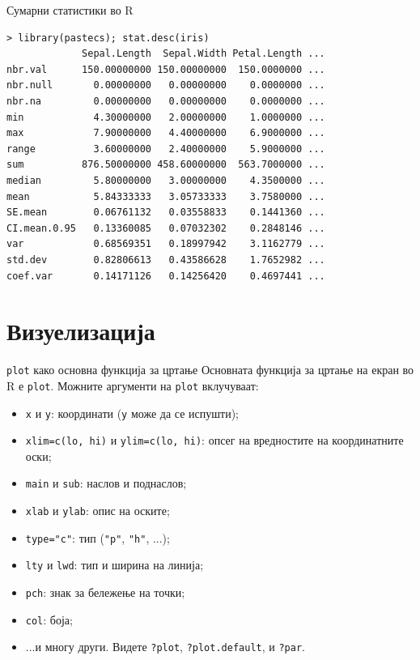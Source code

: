 \documentclass[hyperref={unicode}, xcolor={svgnames, table},
usepdftitle=false]{beamer}
\theoremstyle{remark}
\begin{document}
\begin{frame}[fragile]{Сумарни статистики во R}
\begin{verbatim}
> library(pastecs); stat.desc(iris)
             Sepal.Length  Sepal.Width Petal.Length ...
nbr.val      150.00000000 150.00000000  150.0000000 ...
nbr.null       0.00000000   0.00000000    0.0000000 ...
nbr.na         0.00000000   0.00000000    0.0000000 ...
min            4.30000000   2.00000000    1.0000000 ...
max            7.90000000   4.40000000    6.9000000 ...
range          3.60000000   2.40000000    5.9000000 ...
sum          876.50000000 458.60000000  563.7000000 ...
median         5.80000000   3.00000000    4.3500000 ...
mean           5.84333333   3.05733333    3.7580000 ...
SE.mean        0.06761132   0.03558833    0.1441360 ...
CI.mean.0.95   0.13360085   0.07032302    0.2848146 ...
var            0.68569351   0.18997942    3.1162779 ...
std.dev        0.82806613   0.43586628    1.7652982 ...
coef.var       0.14171126   0.14256420    0.4697441 ...
\end{verbatim}
\end{frame}

\section{Визуелизација}

\begin{frame}{\texttt{plot} како основна функција за цртање}
  Основната функција за цртање на екран во R е \texttt{plot}.  Можните
  аргументи на \texttt{plot} вклучуваат:
  \begin{itemize}
  \item \texttt{x} и \texttt{y}: координати (\texttt{y} може
    да се испушти);
  \item \texttt{xlim=c(lo, hi)} и \texttt{ylim=c(lo, hi)}: опсег на
    вредностите на координатните оски;
  \item \texttt{main} и \texttt{sub}: наслов и поднаслов;
  \item \texttt{xlab} и \texttt{ylab}: опис на оските;
  \item \texttt{type="c"}: тип (\texttt{"p"}, \texttt{"h"},
    ...);
  \item \texttt{lty} и \texttt{lwd}: тип и ширина на линија;
  \item \texttt{pch}: знак за бележење на точки;
  \item \texttt{col}: боја;
  \item ...и многу други.  Видете \texttt{?plot},
    \texttt{?plot.default}, и \texttt{?par}.
  \end{itemize}
\end{frame}
\end{document}
